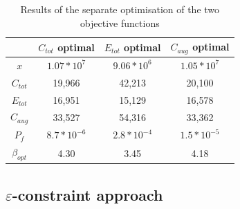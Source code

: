 \begin{table}[]
    \centering
    \begin{tabular}{c|c|c|c}
         &   $C_{tot}$ optimal&$E_{tot}$ optimal &$C_{aug}$ optimal\\ \hline
         $x$& 
     $1.07*10^7$&$9.06*10^6$
&$1.05*10^{7}$\\
 $C_{tot}$& 19,966&42,213
&20,100\\
 $E_{tot}$& 16,951&15,129
&16,578\\
 $C_{aug}$& 33,527& 54,316&33,362\\
 $P_f$& $8.7*10^{-6}$&$2.8*10^{-4}$
&$1.5*10^{-5}$\\
 $\beta_{opt}$& 4.30&3.45&4.18\\\end{tabular}
    \caption{Results of the separate optimisation of the two objective functions}
    \label{tab:single}
\end{table}

\newpage
\subsection{$\varepsilon$-constraint approach}

